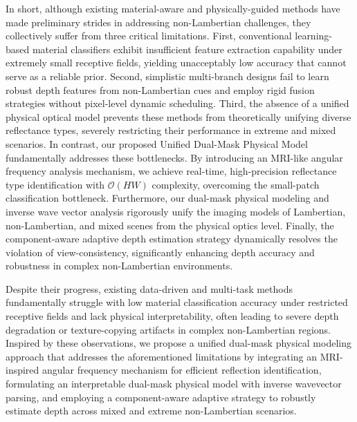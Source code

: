 In short, although existing material-aware and physically-guided methods have made preliminary strides in addressing non-Lambertian challenges, they collectively suffer from three critical limitations. First, conventional learning-based material classifiers exhibit insufficient feature extraction capability under extremely small receptive fields, yielding unacceptably low accuracy that cannot serve as a reliable prior. Second, simplistic multi-branch designs fail to learn robust depth features from non-Lambertian cues and employ rigid fusion strategies without pixel-level dynamic scheduling. Third, the absence of a unified physical optical model prevents these methods from theoretically unifying diverse reflectance types, severely restricting their performance in extreme and mixed scenarios. In contrast, our proposed Unified Dual-Mask Physical Model fundamentally addresses these bottlenecks. By introducing an MRI-like angular frequency analysis mechanism, we achieve real-time, high-precision reflectance type identification with \(\mathcal{O}(HW)\) complexity, overcoming the small-patch classification bottleneck. Furthermore, our dual-mask physical modeling and inverse wave vector analysis rigorously unify the imaging models of Lambertian, non-Lambertian, and mixed scenes from the physical optics level. Finally, the component-aware adaptive depth estimation strategy dynamically resolves the violation of view-consistency, significantly enhancing depth accuracy and robustness in complex non-Lambertian environments.

Despite their progress, existing data-driven and multi-task methods fundamentally struggle with low material classification accuracy under restricted receptive fields and lack physical interpretability, often leading to severe depth degradation or texture-copying artifacts in complex non-Lambertian regions. Inspired by these observations, we propose a unified dual-mask physical modeling approach that addresses the aforementioned limitations by integrating an MRI-inspired angular frequency mechanism for efficient reflection identification, formulating an interpretable dual-mask physical model with inverse wavevector parsing, and employing a component-aware adaptive strategy to robustly estimate depth across mixed and extreme non-Lambertian scenarios.